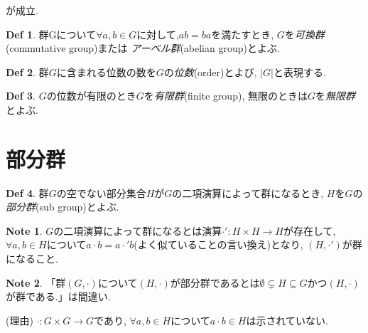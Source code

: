 \documentclass[dvipdfmx]{jsarticle}
\theoremstyle{definition}
\newtheorem{definition}{Def}
\newtheorem{note}{Note}
\numberwithin{equation}{section}
\numberwithin{props}{section}
\numberwithin{definition}{section}
\numberwithin{note}{section}
\begin{document}
が成立.

\begin{definition}
     群Gについて$\forall a,b\in G$に対して,$ab=ba$を満たすとき, $G$を\emph{可換群}(commutative group)または
     \emph{アーベル群}(abelian group)とよぶ.
\end{definition}
\begin{definition}
     群$G$に含まれる位数の数を$G$の\emph{位数}(order)とよび, $\lvert G\rvert$と表現する.
\end{definition}
\begin{definition}
     $G$の位数が有限のとき$G$を\emph{有限群}(finite group), 無限のときは$G$を\emph{無限群}とよぶ.
\end{definition}
\section{部分群}
\begin{definition}\label{def::subgroup}
     群$G$の空でない部分集合$H$が$G$の二項演算によって群になるとき, $H$を$G$の\emph{部分群}(sub group)とよぶ.
\end{definition}
\begin{note}
     $G$の二項演算によって群になるとは演算$\cdot': H\times H\to H$が存在して, $\forall a,b\in H$について$a\cdot b=a\cdot' b$(よく似ていることの言い換え)となり, $(H,\cdot')$が群になること.
\end{note}
\begin{note}
     「群$(G,\cdot)$について$(H,\cdot)$が部分群であるとは$\emptyset\subsetneq H\subseteq G$かつ$(H,\cdot)$が群である.」は間違い.
\end{note}
(理由) $\cdot: G\times G\to G$であり, $\forall a,b\in H$について$a\cdot b\in H$は示されていない.\\
\end{document}
